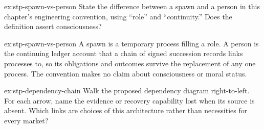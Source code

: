 \documentclass[11pt,a4paper]{article}
\theoremstyle{definition}
\begin{document}
\begin{pdexercise}[kind=Check,rating=1]{ex:stp-spawn-vs-person}
State the difference between a spawn and a person in this chapter's
engineering convention, using ``role'' and ``continuity.'' Does the
definition assert consciousness?
\end{pdexercise}
\begin{pdsolution}{ex:stp-spawn-vs-person}
A spawn is a temporary process filling a role. A person is the continuing
ledger account that a chain of signed succession records links processes to,
so its obligations and outcomes survive the replacement of any one process.
The convention makes no claim about consciousness or moral status.
\end{pdsolution}
\begin{pdexercise}[kind=Trace,rating=2]{ex:stp-dependency-chain}
Walk the proposed dependency diagram right-to-left. For each arrow, name the
evidence or recovery capability lost when its source is absent. Which links are
choices of this architecture rather than necessities for every market?
\end{pdexercise}
\end{document}
